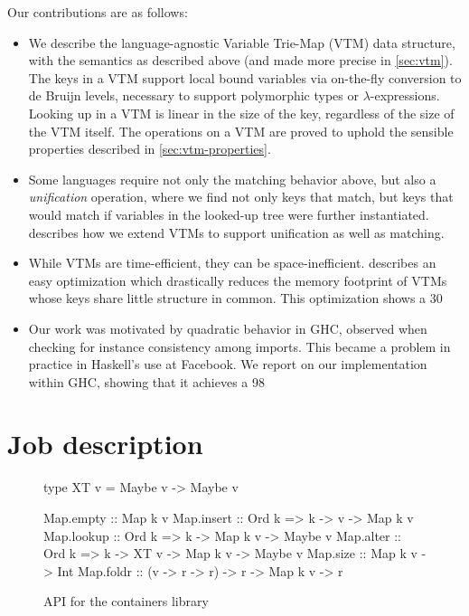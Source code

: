 \documentclass[format=sigplan]{acmart}
\theoremstyle{theorem}
\theoremstyle{definition}
\theoremstyle{remark}
\newenvironment{figurebox}{\begin{figure}}{\end{figure}}
\begin{document}
Our contributions are as follows:

\begin{itemize}
\item We describe the language-agnostic Variable Trie-Map (VTM) data structure, with the semantics as described above (and made more precise in \cref{sec:vtm}). The keys in a VTM support local bound variables via on-the-fly conversion to de Bruijn levels, necessary to support polymorphic types or $\lambda$-expressions. Looking up in a VTM is linear in the size of the key, regardless of the size of the VTM itself. The operations on a VTM are proved to uphold the sensible properties described in \cref{sec:vtm-properties}.
\item Some languages require not only the matching behavior above, but also a \emph{unification} operation, where we find not only keys that match, but keys that would match if variables in the looked-up tree were further instantiated.  describes how we extend VTMs to support unification as well as matching.
\item While VTMs are time-efficient, they can be space-inefficient.  describes an easy optimization which drastically reduces the memory footprint of VTMs whose keys share little structure in common. This optimization shows a 30%
\item Our work was motivated by quadratic behavior in GHC, observed when checking for instance consistency among imports. This became a problem in practice in Haskell's use at Facebook. We report on our implementation within GHC, showing that it achieves a 98%
\end{itemize}

\section{Job description}
\begin{figurebox}
\begin{code}
type XT v = Maybe v -> Maybe v

Map.empty  :: Map k v
Map.insert :: Ord k => k -> v -> Map k v
Map.lookup :: Ord k => k -> Map k v -> Maybe v
Map.alter  :: Ord k => k -> XT v -> Map k v -> Maybe v
Map.size   :: Map k v -> Int
Map.foldr  :: (v -> r -> r) -> r -> Map k v -> r
\end{code}
\caption{API for the containers library}
\label{fig:containers}
\end{figurebox}
\end{document}
